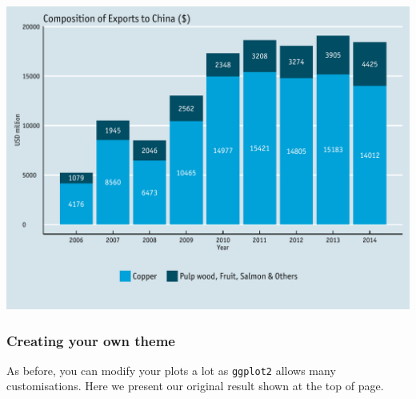 \documentclass[]{article}
\begin{document}
\begin{center}\includegraphics{0_all_posts_pdf/bar_11-1} \end{center}

\subsubsection{Creating your own theme}\label{creating-your-own-theme-2}

As before, you can modify your plots a lot as \texttt{ggplot2} allows
many customisations. Here we present our original result shown at the
top of page.
\end{document}
